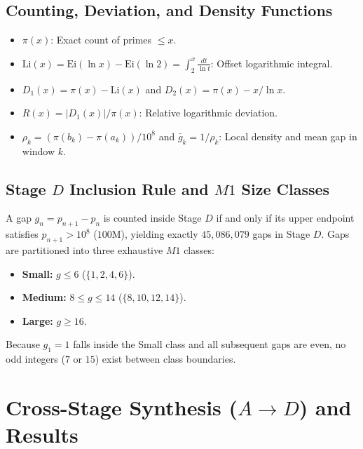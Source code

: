 \documentclass[12pt,a4paper]{article}
\begin{document}
\subsection{Counting, Deviation, and Density Functions}
\begin{itemize}
    \item $\pi(x)$: Exact count of primes $\leq x$.
    \item $\mathrm{Li}(x) = \mathrm{Ei}(\ln x) - \mathrm{Ei}(\ln 2) = \int_2^x \frac{dt}{\ln t}$: Offset logarithmic integral.
    \item $D_1(x) = \pi(x) - \mathrm{Li}(x)$ and $D_2(x) = \pi(x) - x/\ln x$.
    \item $R(x) = |D_1(x)| / \pi(x)$: Relative logarithmic deviation.
    \item $\rho_k = (\pi(b_k) - \pi(a_k)) / 10^8$ and $\bar{g}_k = 1/\rho_k$: Local density and mean gap in window $k$.
\end{itemize}

\subsection{Stage $D$ Inclusion Rule and $M1$ Size Classes}
A gap $g_n = p_{n+1} - p_n$ is counted inside Stage $D$ if and only if its upper endpoint satisfies $p_{n+1} > 10^8$ ($100\text{M}$), yielding exactly $45,086,079$ gaps in Stage $D$. Gaps are partitioned into three exhaustive $M1$ classes:
\begin{itemize}
    \item \textbf{Small:} $g \leq 6$ ($\{1, 2, 4, 6\}$).
    \item \textbf{Medium:} $8 \leq g \leq 14$ ($\{8, 10, 12, 14\}$).
    \item \textbf{Large:} $g \geq 16$.
\end{itemize}
Because $g_1 = 1$ falls inside the Small class and all subsequent gaps are even, no odd integers ($7$ or $15$) exist between class boundaries.

\section{Cross-Stage Synthesis ($A \rightarrow D$) and Results}
\end{document}

